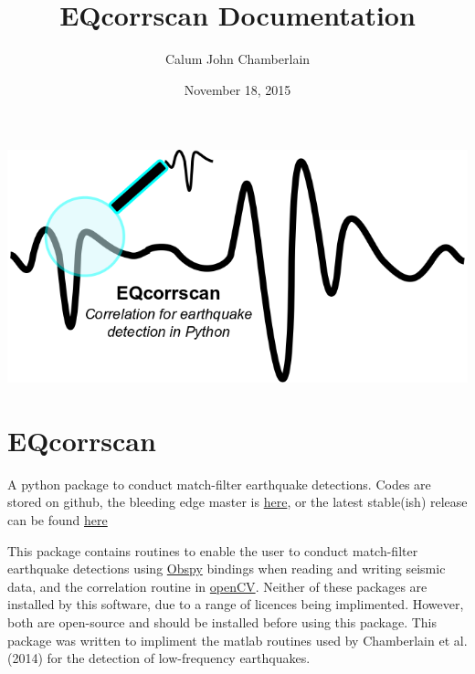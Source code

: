 \documentclass[a4paper,10pt,english]{sphinxmanual}
\title{EQcorrscan Documentation}
\date{November 18, 2015}
\author{Calum John Chamberlain}
\begin{document}
\maketitle
\tableofcontents
{}\label{index::doc}

\href{https://github.com/calum-chamberlain/EQcorrscan/releases}{\includegraphics{EQcorrscan_logo.png}}

\chapter{EQcorrscan}
\label{index:eqcorrscan}\label{index:welcome-to-eqcorrscan-s-documentation}
A python package to conduct match-filter earthquake detections.  Codes are stored
on github, the bleeding edge master is \href{https://github.com/calum-chamberlain/EQcorrscan}{here}, or the latest stable(ish) release
can be found \href{https://github.com/calum-chamberlain/EQcorrscan/releases}{here}

This package contains routines to enable the user to conduct match-filter earthquake
detections using \href{https://github.com/obspy/obspy/wiki}{Obspy} bindings when reading
and writing seismic data, and the correlation routine in \href{http://opencv.org/}{openCV}.
Neither of these packages are installed by this software, due to a range of
licences being implimented.  However, both are open-source and should be installed
before using this package.  This package was written to impliment the matlab routines
used by Chamberlain et al. (2014) for the detection of low-frequency earthquakes.
\end{document}
